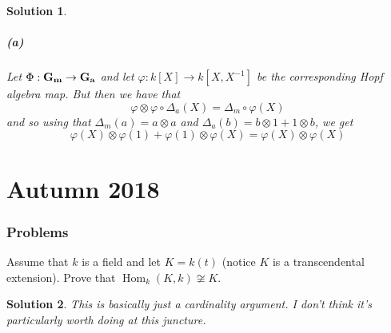 \documentclass[12pt]{article}
\theoremstyle{nonumberbreak}
\newtheorem{sol}{Solution}
\theoremstyle{changebreak}
\theoremstyle{nonumberplain}
\theoremstyle{change}
\DeclareMathOperator{\Hom}{Hom}
\newcommand*{\Ga}{\ensuremath\mathbf{G_a}}
\newcommand*{\Gm}{\ensuremath\mathbf{G_m}}
\let\oldpart\part%
\renewcommand{\part}{\clearpage\oldpart}%
\begin{document}
\begin{sol}
	\subsubsection*{(a)}
	Let $\Phi:\Gm\to\Ga$ and let $\varphi:k[X]\to k[X,X^{-1}]$ be the corresponding Hopf
	algebra map. But then we have that 
	\[\varphi\otimes\varphi \circ \Delta_a(X)=\Delta_m\circ\varphi(X)\]
	and so using that $\Delta_m(a)=a\otimes a$ and $\Delta_a(b)=b\otimes1+1\otimes b$, we get
	\[\varphi(X)\otimes\varphi(1)+\varphi(1)\otimes\varphi(X)=\varphi(X)\otimes\varphi(X)\]
\end{sol}


\part{Autumn 2018}
\section{Problems}
\begin{prob}
	Assume that $k$ is a field and let $K=k(t)$ (notice $K$ is a transcendental extension). Prove that $\Hom_k(K,k)\not\cong K$.
\end{prob}

\begin{sol}
	This is basically just a cardinality argument. I don't think it's particularly worth doing at this juncture.
\end{sol}
\end{document}
